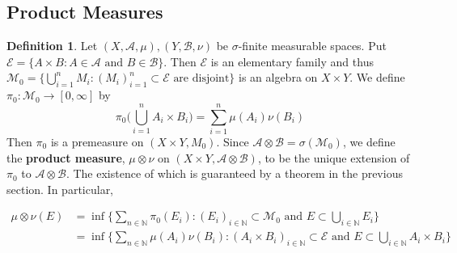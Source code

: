 \documentclass[12pt]{amsart}
\theoremstyle{definition}
\newtheorem{defn}[definition]{Definition}
\newcommand{\sig}{\sigma}
\newcommand{\N}{\mathbb{N}}
\newcommand{\MA}{\mathcal{A}}
\newcommand{\MB}{\mathcal{B}}
\newcommand{\ME}{\mathcal{E}}
\newcommand{\MM}{\mathcal{M}}
\newcommand{\RG}{[0,\infty]}
\newcommand{\ld}[1]{\label{defn:#1}}
\begin{document}
	
	
	
	
	
	
	
	
	
	
	
	
	
	
	
	\newpage
	\subsection{Product Measures}
	
	\begin{defn} \ld{00000} 
		Let $(X,\MA, \mu), (Y,\MB, \nu)$ be $\sig$-finite measurable spaces. Put $\ME = \{A \times B: A \in \MA \text{ and } B \in \MB\}$. Then $\ME$ is an elementary family and thus $\MM_0 = \{\bigcup_{i =1}^n M_i: (M_i)_{i=1 }^n \subset \ME \text{ are disjoint}\}$ is an algebra on $X \times Y$. We define $\pi_0: \MM_0 \rightarrow \RG$ by $$\pi_0\bigg(\bigcup_{i=1}^n A_i \times B_i \bigg) = \sum_{i=1}^n\mu(A_i)\nu(B_i)$$ Then $\pi_0$ is a premeasure on $(X \times Y, M_0)$. Since $\MA \otimes \MB = \sig(\MM_0)$, we define the \textbf{product measure}, $\mu \otimes \nu$ on $(X \times Y, \MA \otimes \MB)$, to be the unique extension of $\pi_0$ to $\MA \otimes \MB$. The existence of which is guaranteed by a theorem in the previous section. In particular,
		
		\begin{align*}
			\mu \otimes \nu(E) 
			&= \inf \bigg\{\sum_{n \in \N}\pi_0(E_i): (E_i)_{i \in \N} \subset \MM_0 \text{ and } E \subset \bigcup_{i \in \N} E_i \bigg\}\\
			&= \inf \bigg\{\sum_{n \in \N}\mu(A_i)\nu(B_i): (A_i \times B_i)_{i \in \N} \subset \ME \text{ and } E \subset \bigcup_{i \in \N} A_i \times B_i \bigg \}
		\end{align*}
	\end{defn}
\end{document}

